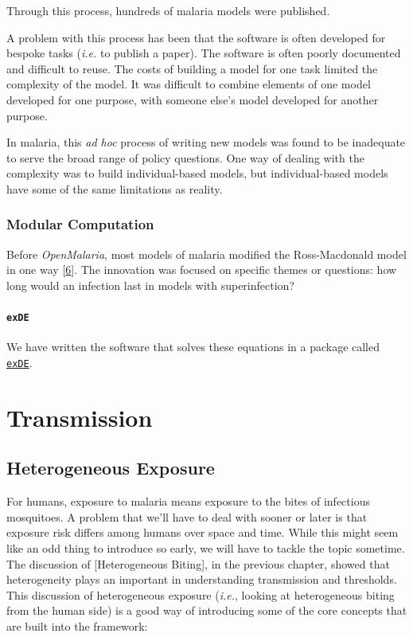 \documentclass[
]{book}
\begin{document}
Through this process, hundreds of malaria models were published.

A problem with this process has been that the software is often developed for bespoke tasks (\emph{i.e.} to publish a paper). The software is often poorly documented and difficult to reuse. The costs of building a model for one task limited the complexity of the model. It was difficult to combine elements of one model developed for one purpose, with someone else's model developed for another purpose.

In malaria, this \emph{ad hoc} process of writing new models was found to be inadequate to serve the broad range of policy questions. One way of dealing with the complexity was to build individual-based models, but individual-based models have some of the same limitations as reality.

\hypertarget{modular-computation}{%
\section{Modular Computation}\label{modular-computation}}

Before \emph{OpenMalaria}, most models of malaria modified the Ross-Macdonald model in one way {[}\protect\hyperlink{ref-ReinerRCJ2013SystematicReview}{6}{]}. The innovation was focused on specific themes or questions: how long would an infection last in models with superinfection?

\hypertarget{exde}{%
\subsection{\texorpdfstring{\texttt{exDE}}{exDE}}\label{exde}}

We have written the software that solves these equations in a package called \href{https://cran.r-project.org/web/packages/exDE/index.html}{\texttt{exDE}}.

\hypertarget{part-transmission}{%
\part{Transmission}\label{part-transmission}}

\hypertarget{heterogeneous-exposure}{%
\chapter{Heterogeneous Exposure}\label{heterogeneous-exposure}}

For humans, exposure to malaria means exposure to the bites of infectious mosquitoes. A problem that we'll have to deal with sooner or later is that exposure risk differs among humans over space and time. While this might seem like an odd thing to introduce so early, we will have to tackle the topic sometime. The discussion of {[}Heterogeneous Biting{]}, in the previous chapter, showed that heterogeneity plays an important in understanding transmission and thresholds. This discussion of heterogeneous exposure (\emph{i.e.}, looking at heterogeneous biting from the human side) is a good way of introducing some of the core concepts that are built into the framework:
\end{document}

